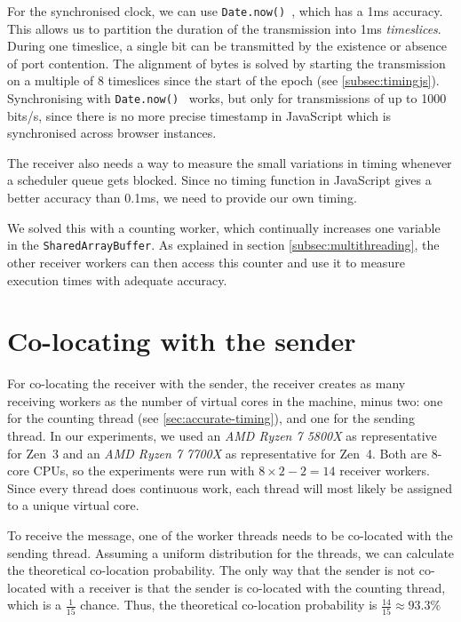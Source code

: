 \documentclass[11pt,
  titlepage=false,
]{scrreprt}
\begin{document}
For the synchronised clock, we can use \texttt{Date.now()}~\cite{datenow}, which has a 1ms accuracy.
This allows us to partition the duration of the transmission into 1ms \textit{timeslices}.
During one timeslice, a single bit can be transmitted by the existence or absence of port contention.
The alignment of bytes is solved by starting the transmission on a multiple of 8 timeslices since the start of the epoch (see \ref{subsec:timingjs}).
Synchronising with \texttt{Date.now()}~\cite{datenow} works, but only for transmissions of up to 1000 bits/s,
since there is no more precise timestamp in JavaScript which is synchronised across browser instances.


The receiver also needs a way to measure the small variations in timing whenever a scheduler queue gets blocked.
Since no timing function in JavaScript gives a better accuracy than 0.1ms, we need to provide our own timing.

We solved this with a counting worker, which continually increases one variable in the \texttt{SharedArrayBuffer}.
As explained in section \ref{subsec:multithreading}, the other receiver workers can then access this counter and use it to measure execution times with adequate accuracy.

\section{Co-locating with the sender}
\label{sec:co-location}
For co-locating the receiver with the sender, the receiver creates as many receiving workers as the number of virtual cores in the machine, minus two:
one for the counting thread (see \ref{sec:accurate-timing}), and one for the sending thread.
In our experiments, we used an \textit{AMD Ryzen 7 5800X} as representative for Zen~3 and an \textit{AMD Ryzen 7 7700X} as representative for Zen~4.
Both are 8-core CPUs, so the experiments were run with $8 \times 2 - 2 = 14$ receiver workers.
Since every thread does continuous work, each thread will most likely be assigned to a unique virtual core.

To receive the message, one of the worker threads needs to be co-located with the sending thread.
Assuming a uniform distribution for the threads, we can calculate the theoretical co-location probability.
The only way that the sender is not co-located with a receiver is that the sender is co-located with the counting thread,
which is a $\frac{1}{15}$ chance.
Thus, the theoretical co-location probability is $\frac{14}{15} \approx 93.3\%$
\end{document}
